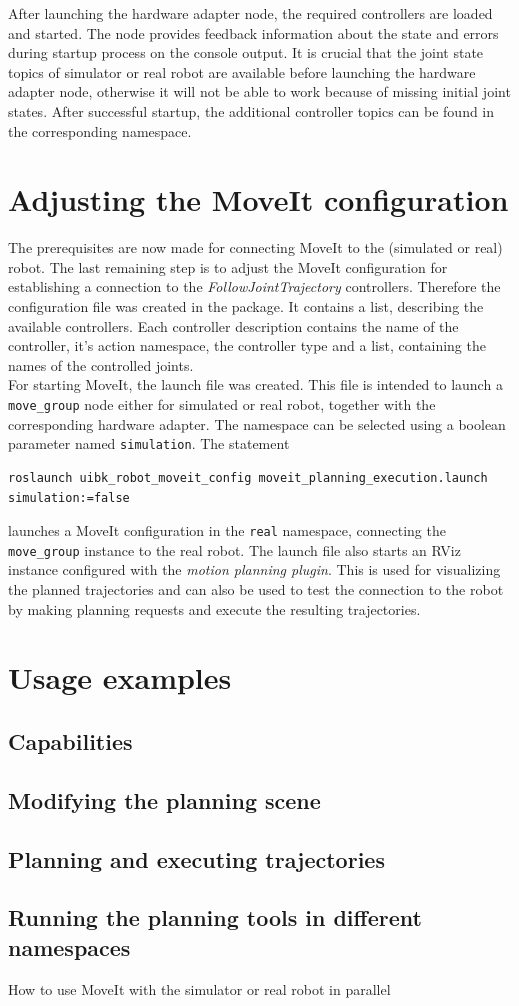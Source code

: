 After launching the hardware adapter node, the required controllers are loaded and started. The node provides feedback information about the state and errors during startup process on the console output. It is crucial that the joint state topics of simulator or real robot are available before launching the hardware adapter node, otherwise it will not be able to work because of missing initial joint states. After successful startup, the additional controller topics can be found in the corresponding namespace.

\section{Adjusting the MoveIt configuration}

The prerequisites are now made for connecting MoveIt to the (simulated or real) robot. The last remaining step is to adjust the MoveIt configuration for establishing a connection to the \emph{FollowJointTrajectory} controllers. Therefore the configuration file  was created in the  package. It contains a list, describing the available controllers. Each controller description contains the name of the controller, it's action namespace, the controller type and a list, containing the names of the controlled joints.\\

For starting MoveIt, the launch file  was created. This file is intended to launch a \texttt{move\_group} node either for simulated or real robot, together with the corresponding hardware adapter. The namespace can be selected using a boolean parameter named \texttt{simulation}. The statement
{\small 
\begin{verbatim}
roslaunch uibk_robot_moveit_config moveit_planning_execution.launch simulation:=false
\end{verbatim}}
launches a MoveIt configuration in the \texttt{real} namespace, connecting the \texttt{move\_group} instance to the real robot. The launch file also starts an RViz instance configured with the \emph{motion planning plugin}. This is used for visualizing the planned trajectories and can also be used to test the connection to the robot by making planning requests and execute the resulting trajectories.


\section{Usage examples} 

\subsection{Capabilities}

\subsection{Modifying the planning scene}

\subsection{Planning and executing trajectories}

\subsection{Running the planning tools in different namespaces}
How to use MoveIt with the simulator or real robot in parallel